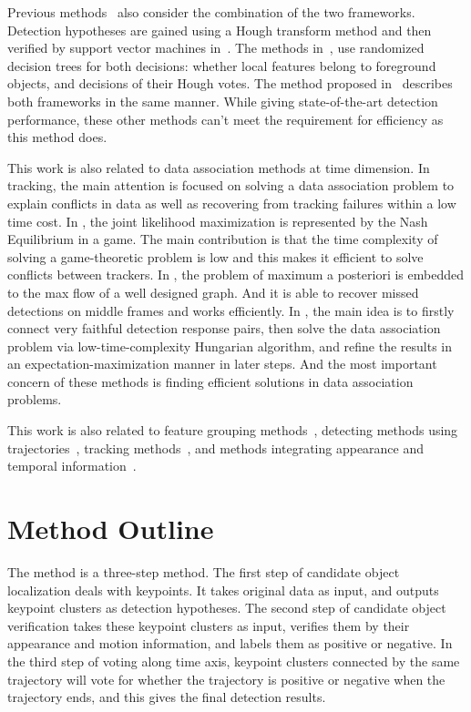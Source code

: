 Previous methods~\citep{ac34} also consider the combination of the two frameworks. Detection hypotheses are gained using a Hough transform method and then verified by support vector machines in~\citep{ac10,ac25}. The methods in~\citep{ac6,ac7}, use randomized decision trees for both decisions: whether local features belong to foreground objects, and decisions of their Hough votes. The method proposed in~\citep{ac27} describes both frameworks in the same manner. While giving state-of-the-art detection performance, these other methods can't meet the requirement for efficiency as this method does.







This work is also related to data association methods at time dimension. In tracking, the main attention is focused on solving a data
association problem to explain conflicts in data as well as
recovering from tracking failures within a low time cost. In
\citep{ij9}, the joint likelihood maximization is represented by the
Nash Equilibrium in a game. The main contribution is that the time
complexity of solving a game-theoretic problem is low and this makes it efficient to
solve conflicts between trackers. In
\citep{ij10}, the problem of maximum a posteriori is embedded to the max flow of a well designed
graph. And it is able to recover
missed detections on middle frames and works efficiently. In
\citep{my7}, the main idea is to firstly connect very faithful
detection response pairs, then solve the data association problem
via low-time-complexity Hungarian algorithm, and refine the results
in an expectation-maximization manner in later steps. And the most important concern of these methods
is finding efficient solutions in   data association problems.

This work is also related to feature grouping methods~\citep{ac25}, detecting methods using trajectories~\citep{my9,ac24}, tracking methods~\citep{my7,my10}, and methods integrating appearance and temporal information~\citep{ac23}.




\section{Method Outline}
\label{ab}
The  method is a three-step method. The first step of candidate object localization deals with keypoints. It
takes original data as input, and outputs keypoint clusters as detection hypotheses. The second
step of candidate object verification takes these keypoint clusters as input, verifies them by their appearance and motion
information, and labels them as positive or negative. In the third step of voting along time axis, keypoint clusters connected by the same trajectory will vote for whether the trajectory is positive or negative when the trajectory ends, and this gives the final detection results.

